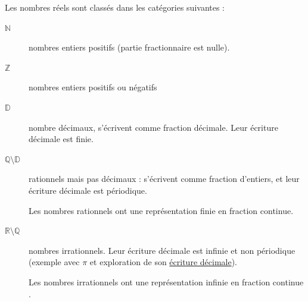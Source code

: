\begin{eBox}
	Les nombres réels sont classés dans les catégories suivantes :
	\begin{description}
		\item[$\mathbb{N}$] nombres entiers positifs (partie fractionnaire est nulle).
		\item[$\mathbb{Z}$] nombres entiers positifs ou négatifs
		\item[$\mathbb{D}$] nombre décimaux, s'écrivent comme fraction décimale. Leur écriture décimale est finie.
		\item[$\mathbb{Q}\setminus\mathbb{D}$] rationnels mais pas décimaux : s'écrivent comme fraction d'entiers, et leur écriture décimale est périodique.
		
		Les nombres rationnels ont une représentation finie en fraction continue.
		\item[$\mathbb{R}\setminus\mathbb{Q}$] nombres irrationnels. Leur écriture décimale est infinie et non périodique (exemple avec $\pi$ et exploration de son  \hyperlink{https://math.fit/pi-digits}{écriture décimale}).
		
		Les nombres irrationnels ont une représentation infinie en fraction continue .
	\end{description} 
\end{eBox}   
 

\newpage 
{}  
\pagestyle{scrheadings} %
\onehalfspacing 
